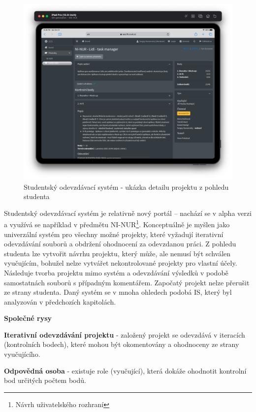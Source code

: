 \begin{figure}[htbp]
   \centering
   \includegraphics[max width=\textwidth]{assets/analysis-sos-portal}
   \caption[Studentský odevzdávací systém - ukázka detailu projektu]{Studentský odevzdávací systém - ukázka detailu projektu z pohledu studenta}\label{pic:sos-portal}
\end{figure}


Studentský odevzdávací systém je relativně nový portál -- nachází se v alpha verzi a využívá se například v předmětu NI-NUR\footnote{Návrh uživatelského rozhraní}.
Konceptuálně je myšlen jako univerzální systém pro všechny možné projekty, které vyžadují iterativní odevzdávání souborů a obdržení ohodnocení za odevzdanou práci.
Z pohledu studenta lze vytvořit návrhu projektu, který může, ale nemusí být schválen vyučujícím, bohužel nelze vytvářet nekontrolované projekty pro vlastní účely.
Následuje tvorba projektu mimo systém a odevzdávání výsledků v podobě samostatnách souborů s případným komentářem.
Započatý projekt nelze přerušit ze strany studenta.
Daný systém se v mnoha ohledech podobá \gls{IS}, který byl analyzován v předchozích kapitolách.

\textbf{Společné rysy}

\begin{ul}
   \item
   \textbf{Iterativní odevzdávání projektu} - založený projekt se odevzdává v iteracích (kontrolních bodech), které mohou být okomentovány a ohodnoceny ze strany vyučujícího.
   \item
   \textbf{Odpovědná osoba} - existuje role (vyučující), která dokáže ohodnotit kontrolní bod určitých počtem bodů.
\end{ul}


